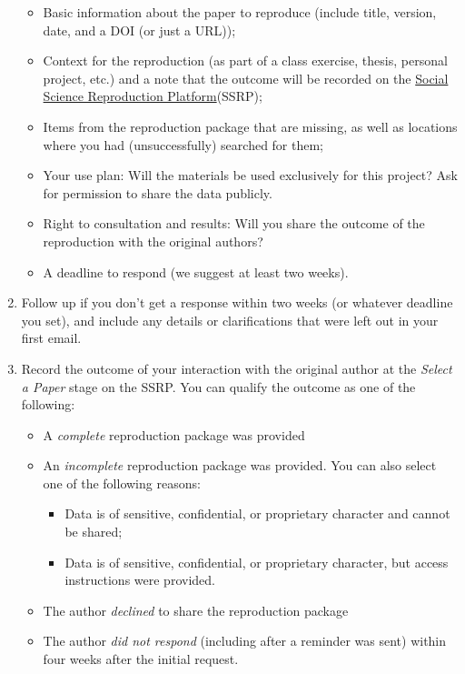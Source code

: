 \documentclass[
]{book}
\providecommand{\tightlist}{%
  \setlength{\itemsep}{0pt}\setlength{\parskip}{0pt}}
\begin{document}
\begin{enumerate}
  \begin{itemize}
  \tightlist
  \item
    Basic information about the paper to reproduce (include title, version, date, and a DOI (or just a URL));\\
  \item
    Context for the reproduction (as part of a class exercise, thesis, personal project, etc.) and a note that the outcome will be recorded on the \href{https://www.socialsciencereproduction.org/}{Social Science Reproduction Platform}(SSRP);
  \item
    Items from the reproduction package that are missing, as well as locations where you had (unsuccessfully) searched for them;\\
  \item
    Your use plan: Will the materials be used exclusively for this project? Ask for permission to share the data publicly.\\
  \item
    Right to consultation and results: Will you share the outcome of the reproduction with the original authors?\\
  \item
    A deadline to respond (we suggest at least two weeks).
  \end{itemize}
\item
  Follow up if you don't get a response within two weeks (or whatever deadline you set), and include any details or clarifications that were left out in your first email.
\item
  Record the outcome of your interaction with the original author at the \emph{Select a Paper} stage on the SSRP. You can qualify the outcome as one of the following:

  \begin{itemize}
  \tightlist
  \item
    A \emph{complete} reproduction package was provided
  \item
    An \emph{incomplete} reproduction package was provided. You can also select one of the following reasons:

    \begin{itemize}
    \tightlist
    \item
      Data is of sensitive, confidential, or proprietary character and cannot be shared;
    \item
      Data is of sensitive, confidential, or proprietary character, but access instructions were provided.
    \end{itemize}
  \item
    The author \emph{declined} to share the reproduction package
  \item
    The author \emph{did not respond} (including after a reminder was sent) within four weeks after the initial request.
  \end{itemize}
\end{enumerate}
\end{document}
